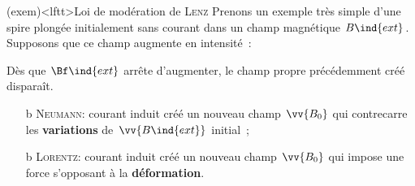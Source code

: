 \documentclass[../../main/main.tex]{subfiles}
\begin{document}
\begin{tcb*}(exem)<lftt>{Loi de modération de \textsc{Lenz}}
	Prenons un exemple très simple d'une spire plongée initialement sans courant
	dans un champ magnétique $B\ind{ext}$. Supposons que ce champ augmente en
	intensité~:
	\begin{center}
	\end{center}
	Dès que $\Bf\ind{ext}$ arrête d'augmenter, le champ propre précédemment créé
	disparaît.
\end{tcb*}

\begin{itemize}
	\item[b]{\textsc{Neumann}}: courant induit créé un nouveau champ $\vv{B_0}$
	qui contrecarre les \textbf{variations} de $\vv{B\ind{ext}}$ initial~;
	\item[b]{\textsc{Lorentz}}: courant induit créé un nouveau champ $\vv{B_0}$
	qui impose une force s'opposant à la \textbf{déformation}.
\end{itemize}
\end{document}
